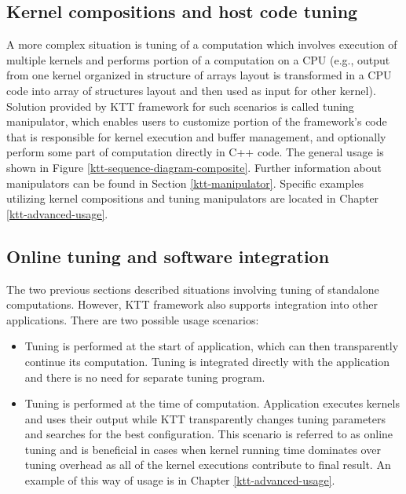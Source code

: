 \documentclass
[
    digital, %
    oneside, %
    table, %
    nolof, %
    nolot, %
    nocover %
]{fithesis3}
\begin{document}
\subsection{Kernel compositions and host code tuning}
A more complex situation is tuning of a computation which involves execution of multiple kernels and performs portion of a computation on a CPU (e.g.,
output from one kernel organized in structure of arrays layout is transformed in a CPU code into array of structures layout and then used as input for
other kernel). Solution provided by KTT framework for such scenarios is called tuning manipulator, which enables users to customize portion of the
framework's code that is responsible for kernel execution and buffer management, and optionally perform some part of computation directly in C++ code.
The general usage is shown in Figure \ref{ktt-sequence-diagram-composite}. Further information about manipulators can be found in Section
\ref{ktt-manipulator}. Specific examples utilizing kernel compositions and tuning manipulators are located in Chapter \ref{ktt-advanced-usage}.

\subsection{Online tuning and software integration}
The two previous sections described situations involving tuning of standalone computations. However, KTT framework also supports integration into other
applications. There are two possible usage scenarios:
\begin{itemize}
    \item Tuning is performed at the start of application, which can then transparently continue its computation. Tuning is integrated directly with
    the application and there is no need for separate tuning program.
    \item Tuning is performed at the time of computation. Application executes kernels and uses their output while KTT transparently changes tuning
    parameters and searches for the best configuration. This scenario is referred to as online tuning and is beneficial in cases when kernel running
    time dominates over tuning overhead as all of the kernel executions contribute to final result. An example of this way of usage is in Chapter
    \ref{ktt-advanced-usage}.
\end{itemize}
\end{document}
